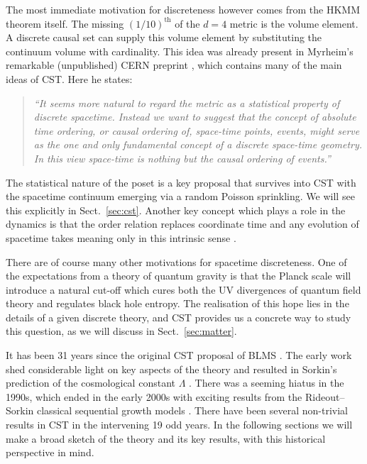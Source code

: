 The most immediate motivation for discreteness however comes from the HKMM theorem itself.  The missing
$\left(1/10\right)^{\mathrm{th}}$ of the $d=4$ metric is the volume element. A discrete causal set can supply this volume
element by substituting the continuum volume with cardinality. 
This idea was already present in Myrheim's remarkable (unpublished)  CERN preprint \citep{myrheim}, which contains many  of the main  ideas of CST. Here he states:
\begin{quote}
\textit{``It seems more natural to regard the metric as a statistical property of discrete spacetime. Instead we
  want to suggest that the concept of absolute time ordering, or causal ordering of, space-time points, events, might
  serve as the one and only fundamental concept of a discrete space-time geometry. In this view space-time is nothing
  but the causal ordering of events.''}  
\end{quote}

The statistical nature of the poset is a key proposal that survives into CST with the  spacetime continuum emerging 
via a random Poisson sprinkling. We will see this explicitly in Sect.~\ref{sec:cst}. Another key concept which plays a
role in the dynamics is that the
order relation replaces coordinate time and any evolution of spacetime takes meaning only in this intrinsic sense
\citep{lambdatwo}. 


There are of course many other motivations for spacetime discreteness. One of the expectations from a theory of quantum gravity is
that the Planck scale will introduce a natural cut-off which cures both  the UV divergences of quantum field theory and
regulates black hole entropy. The realisation of this hope lies in the details of a given discrete theory, and CST
provides us a concrete way to study this question, as we will discuss in Sect.~\ref{sec:matter}.  %






It has been 31 years  since the original CST proposal of BLMS \citep{blms}. The early work shed
considerable  light on key aspects of the theory \citep{blms,bommeyer,bg} and resulted in  Sorkin's prediction of the
cosmological constant $\Lambda$ 
\citep{lambdaone}.  There was a seeming  hiatus in the 1990s, which ended  in the early 2000s
with  exciting  results from the Rideout--Sorkin  classical sequential growth  models \citep{csgone,csgtwo,csgrg,davidthesis}.
There have been several non-trivial results  in CST in the intervening 19 odd years.  In the following sections we will
make a broad sketch of the theory and its key  results,  with this historical perspective in
mind. 




